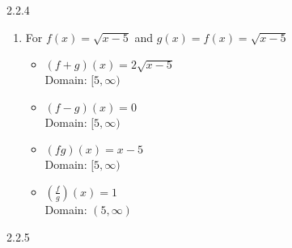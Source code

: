 \begin{Answer}{2.2.4}
\begin{enumerate}
\begin{multicols}{2}
		\end{multicols}

		\item For   $f(x) = \sqrt{x-5}$ and $g(x) = f(x) = \sqrt{x-5}$

		\begin{multicols}{2}

			\begin{itemize}

				\item $(f+g)(x) = 2\sqrt{x-5}$ \\
				Domain: $[5,\infty)$

				\vfill

				\columnbreak

				\item $(f-g)(x) =0$ \\
				Domain: $[5,\infty)$


			\end{itemize}

		\end{multicols}

		\begin{multicols}{2}

			\begin{itemize}

				\item $(fg)(x) =x-5$ \\
				Domain: $[5,\infty)$

				\vfill

				\columnbreak

				\item $\left(\frac{f}{g}\right)(x) =1$ \\
				Domain: $(5,\infty)$


			\end{itemize}

		\end{multicols}

    \end{enumerate}

	
\end{Answer}
\begin{Answer}{2.2.5}
	
\end{Answer}
